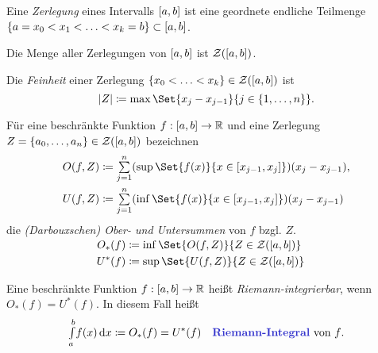 \documentclass{cheat-sheet}
\theoremstyle{definition}
\begin{document}
\begin{defn}
  Eine \emph{Zerlegung} eines Intervalls $\left[ a, b \right]$ ist eine geordnete endliche Teilmenge $\{ a = x_0 < x_1 < \ldots < x_k = b\} \subset \left[ a, b \right]$.
\end{defn}

\begin{nota}
  Die Menge aller Zerlegungen von $\left[ a, b \right]$ ist $\mathcal{Z}(\left[ a, b \right])$.
\end{nota}

\begin{defn}
  Die \emph{Feinheit} einer Zerlegung $\{ x_0 < \ldots < x_k \} \in \mathcal{Z}(\left[ a, b \right])$ ist
  \[ \abs{Z} \coloneqq \max \Set{ x_j - x_{j-1} }{ j \in \{ 1, \ldots, n \} }. \]
\end{defn}

\begin{defn}
  Für eine beschränkte Funktion $f : \left[ a, b \right] \to \mathbb{R}$ und eine Zerlegung $Z = \{ a_0, \ldots, a_n \} \in \mathcal{Z}(\left[ a, b \right])$ bezeichnen
  \begin{align*}
    O(f, Z) &\coloneqq \sum_{j=1}^n (\sup \Set{ f(x) }{ x \in [x_{j-1}, x_j] })(x_j - x_{j-1}),\\
    U(f, Z) &\coloneqq \sum_{j=1}^n (\inf \Set{ f(x) }{ x \in [x_{j-1}, x_j] })(x_j - x_{j-1})
  \end{align*}
  die \emph{(Darbouxschen) Ober- und Untersummen} von $f$ bzgl. $Z$.
\end{defn}

\begin{nota}
  \begin{align*}\\[-24pt]
    O_*(f) &\coloneqq \inf \Set{ O(f, Z) }{ Z \in \mathcal{Z}(\cinterval{a}{b}) }\\
    U^*(f) &\coloneqq \sup \Set{ U(f, Z) }{ Z \in \mathcal{Z}(\cinterval{a}{b}) }\\
  \end{align*}
\end{nota}

\begin{defn}
  Eine beschränkte Funktion $f : \left[ a, b \right] \to \mathbb{R}$ heißt \emph{Riemann-integrierbar}, wenn $O_*(f) = U^*(f)$. In diesem Fall heißt
  \[ \Int{a}{b}{f(x)}{x} \coloneqq O_*(f) = U^*(f) \quad \text{\emph{Riemann-Integral} von $f$.} \]
\end{defn}
\end{document}
